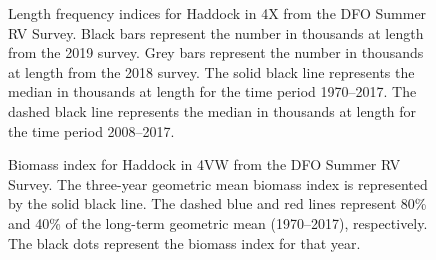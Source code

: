 \documentclass[11pt]{book}
\begin{document}
\begin{figure}[htb]

{\centering {} 

}

\caption{Length frequency indices for Haddock in 4X from the DFO Summer RV Survey. Black bars represent the number in thousands at length from the 2019 survey. Grey bars represent the number in thousands at length from the 2018 survey. The solid black line represents the median in thousands at length for the time period 1970--2017. The dashed black line represents the median in thousands at length for the time period 2008--2017.}\label{fig:16-fig-haddock-lengthfreq4X}
\end{figure}

\begin{figure}[htb]

{\centering {} 

}

\caption{Biomass index for Haddock in 4VW from the DFO Summer RV Survey. The three-year geometric mean biomass index is represented by the solid black line. The dashed blue and red lines represent 80\% and 40\% of the long-term geometric mean (1970--2017), respectively. The black dots represent the biomass index for that year.}\label{fig:17-fig-haddock-biomass4VW}
\end{figure}
\end{document}
